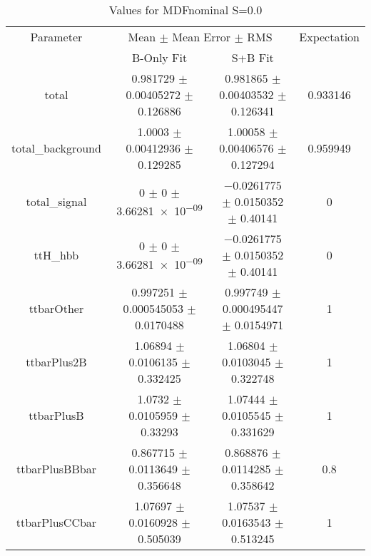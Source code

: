 \begin{table}
\centering
\caption{Values for MDFnominal S=0.0}
\begin{tabular}{cccc}
\toprule
Parameter & \multicolumn{2}{c}{Mean $\pm$ Mean Error $\pm$ RMS} & Expectation\\
 & B-Only Fit & S+B Fit & \\
\midrule
total & \num{0.981729} $\pm$ \num{0.00405272} $\pm$ \num{0.126886} & \num{0.981865} $\pm$ \num{0.00403532} $\pm$ \num{0.126341} & \num{0.933146}\\
total\_background & \num{1.0003} $\pm$ \num{0.00412936} $\pm$ \num{0.129285} & \num{1.00058} $\pm$ \num{0.00406576} $\pm$ \num{0.127294} & \num{0.959949}\\
total\_signal & \num{0} $\pm$ \num{0} $\pm$ \num{3.66281e-09} & \num{-0.0261775} $\pm$ \num{0.0150352} $\pm$ \num{0.40141} & \num{0}\\
ttH\_hbb & \num{0} $\pm$ \num{0} $\pm$ \num{3.66281e-09} & \num{-0.0261775} $\pm$ \num{0.0150352} $\pm$ \num{0.40141} & \num{0}\\
ttbarOther & \num{0.997251} $\pm$ \num{0.000545053} $\pm$ \num{0.0170488} & \num{0.997749} $\pm$ \num{0.000495447} $\pm$ \num{0.0154971} & \num{1}\\
ttbarPlus2B & \num{1.06894} $\pm$ \num{0.0106135} $\pm$ \num{0.332425} & \num{1.06804} $\pm$ \num{0.0103045} $\pm$ \num{0.322748} & \num{1}\\
ttbarPlusB & \num{1.0732} $\pm$ \num{0.0105959} $\pm$ \num{0.33293} & \num{1.07444} $\pm$ \num{0.0105545} $\pm$ \num{0.331629} & \num{1}\\
ttbarPlusBBbar & \num{0.867715} $\pm$ \num{0.0113649} $\pm$ \num{0.356648} & \num{0.868876} $\pm$ \num{0.0114285} $\pm$ \num{0.358642} & \num{0.8}\\
ttbarPlusCCbar & \num{1.07697} $\pm$ \num{0.0160928} $\pm$ \num{0.505039} & \num{1.07537} $\pm$ \num{0.0163543} $\pm$ \num{0.513245} & \num{1}\\
\bottomrule
\end{tabular}
\end{table}